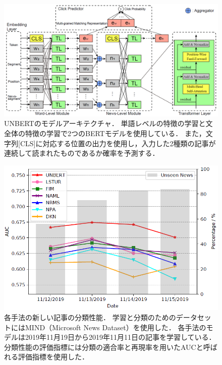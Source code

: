 \documentclass[12pt,a4j]{jreport}
\begin{document}
\begin{figure}[H]
	\centering
	\includegraphics[keepaspectratio, width=120mm]{img/unbert_model_architecture.png}
	\caption{
    UNBERTのモデルアーキテクチャ．
    \protect\footnotemark[11]
    単語レベルの特徴の学習と文全体の特徴の学習で2つのBERTモデルを使用している．
    また，文字列[CLS]に対応する位置の出力を使用し，入力した2種類の記事が連続して読まれたものであるか確率を予測する．
  }
	\label{fig_unbert_model_architecture}
\end{figure}

\begin{figure}[H]
	\centering
	\includegraphics[keepaspectratio, width=120mm]{img/unbert_evaluation.png}
	\caption{
    各手法の新しい記事の分類性能．
    \protect\footnotemark[12]
    学習と分類のためのデータセットにはMIND（Microsoft News Dataset）を使用した．
    各手法のモデルは2019年11月19日から2019年11月11日の記事を学習している．
    分類性能の評価指標には分類の適合率と再現率を用いたAUCと呼ばれる評価指標を使用した．
  }
	\label{fig_unbert_evaluation}
\end{figure}
\end{document}
